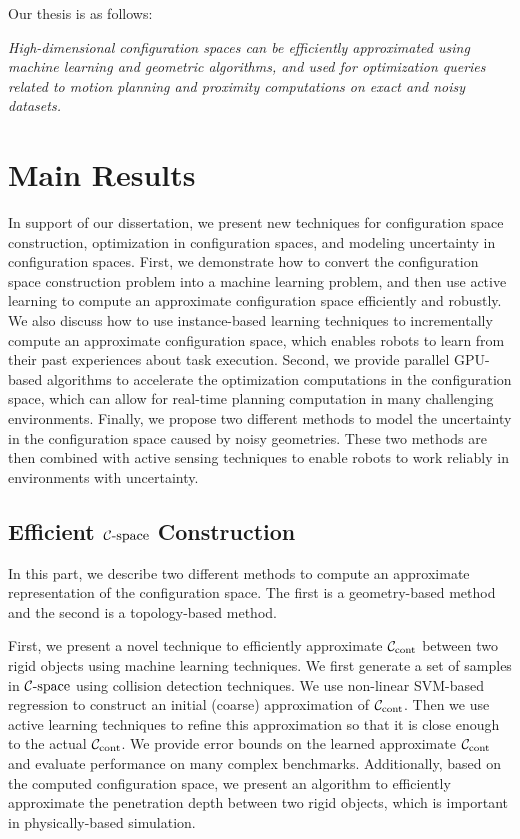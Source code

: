 Our thesis is as follows:

\textit{High-dimensional configuration spaces can be efficiently approximated using machine learning and geometric algorithms, and used for optimization queries related to motion planning and proximity computations on exact and noisy datasets.}

\section{Main Results}
In support of our dissertation, we present new techniques for configuration space construction, optimization in configuration spaces, and modeling uncertainty in configuration spaces. First, we demonstrate how to convert the configuration space construction problem into a machine learning problem, and then use active learning to compute an approximate configuration space efficiently and robustly. We also discuss how to use instance-based learning techniques to incrementally compute an approximate configuration space, which enables robots to learn from their past experiences about task execution. Second, we provide parallel GPU-based algorithms to accelerate the optimization computations in the configuration space, which can allow for real-time planning computation in many challenging environments. Finally, we propose two different methods to model the uncertainty in the configuration space caused by noisy geometries. These two methods are then combined with active sensing techniques to enable robots to work reliably in environments with uncertainty.

\subsection{Efficient $\mathcal C\text{-space}$ Construction}
In this part, we describe two different methods to compute an approximate representation of the configuration space. The first is a geometry-based method and the second is a topology-based method.

First, we present a novel technique to efficiently approximate $\mathcal C_\text{cont}$ between two rigid objects using machine learning techniques. We first generate a set of samples in $\mathcal C\text{-space}$ using collision detection techniques. We use non-linear SVM-based regression to construct an initial (coarse) approximation of $\mathcal C_\text{cont}$. Then we use active learning techniques to refine this approximation so that it is close enough to the actual $\mathcal C_\text{cont}$. We provide error bounds on the learned approximate $\mathcal C_\text{cont}$ and evaluate performance on many complex benchmarks. Additionally, based on the computed configuration space, we present an algorithm to efficiently approximate the penetration depth between two rigid objects, which is important in physically-based simulation.

